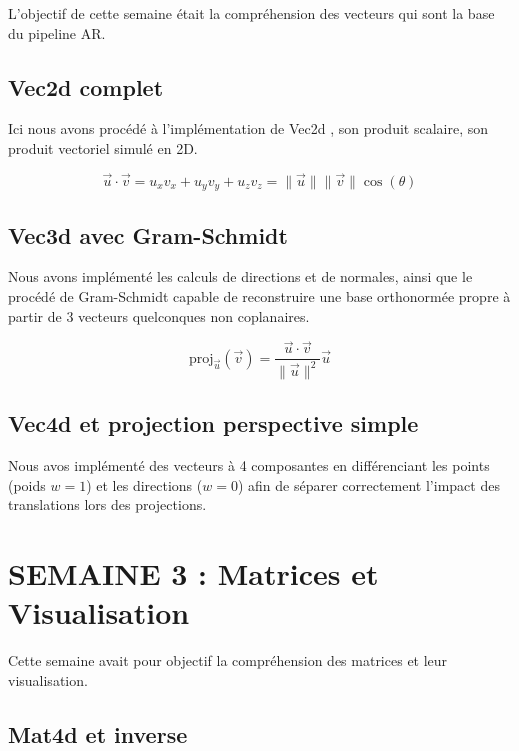 \documentclass[12pt,a4paper]{report}
\begin{document}
L'objectif de cette semaine était la compréhension des vecteurs qui sont la base du pipeline AR.

\section{Vec2d complet}

Ici nous avons procédé à l'implémentation de Vec2d , son produit scalaire, son produit vectoriel simulé en 2D.

 $$\vec{u} \cdot \vec{v} = u_x v_x + u_y v_y + u_z v_z = \|\vec{u}\| \|\vec{v}\| \cos(\theta)$$

\section{Vec3d avec Gram-Schmidt}

Nous avons implémenté les calculs de directions et de normales, ainsi que le procédé de Gram-Schmidt capable de reconstruire une base orthonormée propre à partir de 3 vecteurs quelconques non coplanaires.

 $$\text{proj}_{\vec{u}}(\vec{v}) = \frac{\vec{u} \cdot \vec{v}}{\|\vec{u}\|^2} \vec{u}$$

\section{Vec4d et projection perspective simple}

Nous avos implémenté des vecteurs à 4 composantes en différenciant les points (poids $w=1$) et les directions ($w=0$) afin de séparer correctement l'impact des translations lors des projections.



\chapter{SEMAINE 3 : Matrices et Visualisation}

Cette semaine avait pour objectif la compréhension des matrices et leur visualisation.

\section{Mat4d et inverse}
\end{document}
